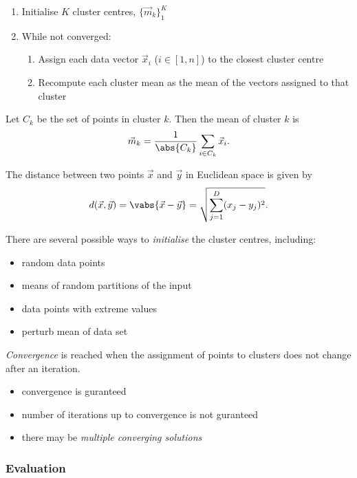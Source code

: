\documentclass{article}
\begin{document}
\begin{enumerate}
	\item Initialise $K$ cluster centres, $\{\vec m_k\}^K_1$
	\item While not converged: \begin{enumerate}
		\item Assign each data vector $\vec x_i$ ($i\in[1,n]$) to the closest cluster centre
		\item Recompute each cluster mean as the mean of the vectors assigned to that cluster
	\end{enumerate}
\end{enumerate}
\begin{theorem}
	Let $C_k$ be the set of points in cluster $k$. Then the mean of cluster $k$
	is 
	\begin{align*}
		\vec m_k=\frac{1}{\abs{C_k}}\sum_{i\in C_k}\vec x_i.
	\end{align*}
\end{theorem}
\begin{definition}
	The distance between two points $\vec x$ and $\vec y$ in Euclidean space
	is given by
	\begin{align*}
		d(\vec x, \vec y) = \vabs{\vec x - \vec y}=\sqrt{\sum_{j=1}^D(x_j-y_j)^2}.
	\end{align*}
\end{definition}
There are several possible ways to \emph{initialise} the cluster centres, including:
\begin{itemize}
	\item random data points
	\item means of random partitions of the input
	\item data points with extreme values
	\item perturb mean of data set 
\end{itemize}
\begin{definition}
	\emph{Convergence} is reached when the assignment of points to clusters
	does not change after an iteration.
	\begin{itemize}
		\item convergence is guranteed
		\item number of iterations up to convergence is not guranteed
		\item there may be \emph{multiple converging solutions}
	\end{itemize}
\end{definition}

\subsubsection{Evaluation}
\end{document}
